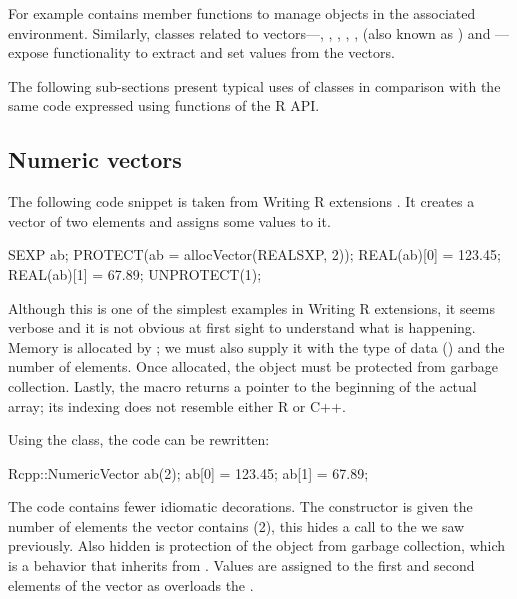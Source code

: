 For example  contains 
member functions to manage objects in the associated environment. 
Similarly, classes related to vectors---, , 
, , , 
 (also known as ) and 
---expose functionality to extract and set values from the vectors.

The following sub-sections present typical uses of  classes in
comparison with the same code expressed using functions of the R API.

\subsection{Numeric vectors}

The following code snippet is taken from Writing R extensions
\citep{R:exts}. It creates a  vector of two elements 
and assigns some values to it. 

\begin{example}
SEXP ab;
PROTECT(ab = allocVector(REALSXP, 2));
REAL(ab)[0] = 123.45;
REAL(ab)[1] = 67.89;
UNPROTECT(1);
\end{example}

Although this is one of the simplest examples in Writing R extensions, 
it seems verbose and it is not obvious at first sight to understand what is happening.
Memory is allocated by ; we must also supply it with
the type of data () and the number of elements.  Once
allocated, the  object must be protected from garbage
collection.
Lastly, the  macro returns a pointer to the
beginning of the actual array; its indexing does not resemble either R or
C++.

Using the  class, the code can be rewritten: 

\begin{example}
Rcpp::NumericVector ab(2);
ab[0] = 123.45;
ab[1] = 67.89;
\end{example}

The code contains fewer idiomatic decorations. The 
constructor is given the number of elements the vector contains (2), this
hides a call to the  we saw previously. Also hidden is
protection of the object from garbage collection, which is a behavior that
 inherits from .  Values are assigned to
the first and second elements of the vector as  overloads
the .

